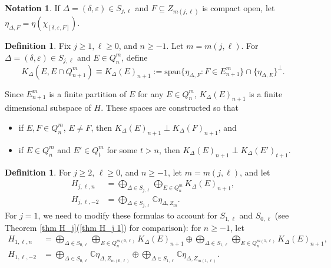 \documentclass[12pt]{amsart}
\newcommand{\sse}{\subseteq}
\newcommand{\spn}{\text{span}}
\newcommand{\C}{\mathbb{C}}
\newcommand{\de}{\delta}
\newcommand{\De}{\Delta}
\newcommand{\ep}{\varepsilon}
\theoremstyle{plain} %
\theoremstyle{definition} %
\newtheorem{Definition}[Theorem]{Definition}
\newtheorem{Notation}[Theorem]{Notation}
\begin{document}
\begin{Notation}
    If $\De = (\de, \ep) \in S_{j,\ell}$ and $F \sse Z_{m(j,\ell)}$ is compact open, let $\eta_{\De, F} = \eta(\chi_{[\de, \ep, F]})$.
\end{Notation}


\begin{Definition}\label{def K spaces}
   Fix $j \ge 1, \ell \ge 0$, and $n \ge -1$. Let $m = m(j,\ell)$. For $\De = (\de, \ep) \in S_{j, \ell}$ and $E \in Q_n^m$, define
       $$K_{\De}(E, E\cap Q_{n+1}^m) \equiv K_{\De}(E)_{n+1} := \spn\{\eta_{\De, F} : F \in E_{n+1}^m \} \cap \{\eta_{\De, E}\}^{\perp}.$$
\end{Definition}
Since $E_{n+1}^m$ is a finite partition of $E$ for any $E \in Q_n^m$, $K_{\De}(E)_{n+1}$ is a finite dimensional subspace of $H$. These spaces are constructed so that 
\begin{itemize}
    \item if $E, F \in Q_n^m$, $E \neq F$, then $K_{\De}(E)_{n+1} \perp K_{\De}(F)_{n+1}$, and

    \item if $E \in Q_n^m$ and $E' \in Q_t^m$ for some $t > n$, then $K_{\De}(E)_{n+1} \perp K_{\De}(E')_{t+1}$.
\end{itemize}

\begin{Definition}\label{def H_j l n}
    For $j \ge 2$, $\ell \ge 0$, and $n \ge -1$, let $m = m(j,\ell)$, and let
    \begin{align*}
        H_{j, \ell, n} &= \bigoplus_{\De \in S_{j,\ell}} \bigoplus_{E \in Q_n^{m}} K_{\De}(E)_{n+1},\\
        H_{j,\ell,-2} &= \bigoplus_{\De \in S_{j,\ell}} \C \eta_{\De, Z_m}.
    \end{align*}
    For $j =1$, we need to modify these formulas to account for $S_{1,\ell}$ and $S_{0,\ell}$ (see Theorem \ref{thm H_j}(\ref{thm H_j 1}) for comparison): for $n \ge -1$, let
    \begin{align*}
        H_{1,\ell,n} &= \bigoplus_{\De \in S_{0,\ell}} \bigoplus_{E \in Q_n^{m(0,\ell)}} K_{\De}(E)_{n+1} \oplus \bigoplus_{\De \in S_{1,\ell}} \bigoplus_{E \in Q_n^{m(1,\ell)}} K_{\De}(E)_{n+1},\\
        H_{1, \ell, -2} &= \bigoplus_{\De \in S_{0,\ell}} \C \eta_{\De, Z_{m(0,\ell)}} \oplus \bigoplus_{\De \in S_{1,\ell}} \C \eta_{\De, Z_{m(1,\ell)}}.
    \end{align*}
\end{Definition}
\end{document}

